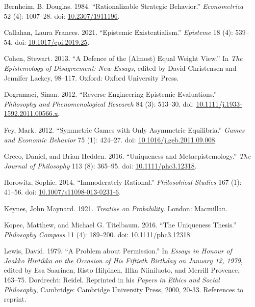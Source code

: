 \documentclass[
  11pt,
  letterpaper,
  DIV=11,
  numbers=noendperiod,
  twoside]{scrartcl}
\newlength{\cslhangindent}
\newenvironment{CSLReferences}[2] %
 {\begin{list}{}{%
  \setlength{\itemindent}{0pt}
  \setlength{\leftmargin}{0pt}
  \setlength{\parsep}{0pt}
  \ifodd #1
   \setlength{\leftmargin}{\cslhangindent}
   \setlength{\itemindent}{-1\cslhangindent}
  \fi
  \setlength{\itemsep}{#2\baselineskip}}}
 {\end{list}}
\begin{document}
\label{refs}
\begin{CSLReferences}{1}{0}
Bernheim, B. Douglas. 1984. {``Rationalizable Strategic Behavior.''}
\emph{Econometrica} 52 (4): 1007--28. doi:
\href{https://doi.org/10.2307/1911196}{10.2307/1911196}.

Callahan, Laura Frances. 2021. {``Epistemic Existentialism.''}
\emph{Episteme} 18 (4): 539--54. doi:
\href{https://doi.org/10.1017/epi.2019.25}{10.1017/epi.2019.25}.

Cohen, Stewart. 2013. {``A Defence of the (Almost) Equal Weight View.''}
In \emph{The Epistemology of Disagreement: New Essays}, edited by David
Christensen and Jennifer Lackey, 98--117. Oxford: Oxford University
Press.

Dogramaci, Sinan. 2012. {``Reverse Engineering Epistemic Evaluations.''}
\emph{Philosophy and Phenomenological Research} 84 (3): 513--30. doi:
\href{https://doi.org/10.1111/j.1933-1592.2011.00566.x}{10.1111/j.1933-1592.2011.00566.x}.

Fey, Mark. 2012. {``Symmetric Games with Only Asymmetric Equilibria.''}
\emph{Games and Economic Behavior} 75 (1): 424--27. doi:
\href{https://doi.org/10.1016/j.geb.2011.09.008}{10.1016/j.geb.2011.09.008}.

Greco, Daniel, and Brian Hedden. 2016. {``Uniqueness and
Metaepistemology.''} \emph{The Journal of Philosophy} 113 (8): 365--95.
doi: \href{https://doi.org/10.1111/phc3.12318}{10.1111/phc3.12318}.

Horowitz, Sophie. 2014. {``Immoderately Rational.''} \emph{Philosohical
Studies} 167 (1): 41--56. doi:
\href{https://doi.org/10.1007/s11098-013-0231-6}{10.1007/s11098-013-0231-6}.

Keynes, John Maynard. 1921. \emph{Treatise on Probability}. London:
Macmillan.

Kopec, Matthew, and Michael G. Titelbaum. 2016. {``The Uniqueness
Thesis.''} \emph{Philosophy Compass} 11 (4): 189--200. doi:
\href{https://doi.org/10.1111/phc3.12318}{10.1111/phc3.12318}.

Lewis, David. 1979. {``A Problem about Permission.''} In \emph{Essays in
Honour of {J}aakko Hintikka on the Occasion of His Fiftieth Birthday on
{J}anuary 12, 1979}, edited by Esa Saarinen, Risto Hilpinen, Illka
Niiniluoto, and Merrill Provence, 163--75. Dordrecht: Reidel. Reprinted
in his \emph{Papers in Ethics and Social Philosophy}, Cambridge:
Cambridge University Press, 2000, 20-33. References to reprint.


\end{CSLReferences}
\end{document}
